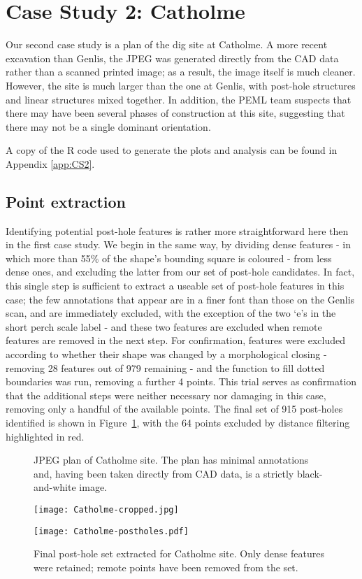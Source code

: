 \documentclass[../../ArchStats.tex]{subfiles}
\begin{document}
\section{Case Study 2: Catholme}
\label{sec:CS2}

Our second case study is a plan of the dig site at Catholme. A more recent excavation than Genlis, the JPEG was generated directly from the CAD data rather than a scanned printed image; as a result, the image itself is much cleaner. However, the site is much larger than the one at Genlis, with post-hole structures and linear structures mixed together. In addition, the PEML team suspects that there may have been several phases of construction at this site, suggesting that there may not be a single dominant orientation.

A copy of the R code used to generate the plots and analysis can be found in Appendix \ref{app:CS2}.

\subsection{Point extraction}
Identifying potential post-hole features is rather more straightforward here then in the first case study. We begin in the same way, by dividing dense features - in which more than 55\% of the shape's bounding square is coloured - from less dense ones, and excluding the latter from our set of post-hole candidates. In fact, this single step is sufficient to extract a useable set of post-hole features in this case; the few annotations that appear are in a finer font than those on the Genlis scan, and are immediately excluded, with the exception of the two `e's in the short perch scale label - and these two features are excluded when remote features are removed in the next step. For confirmation, features were excluded according to whether their shape was changed by a morphological closing - removing 28 features out of 979 remaining - and the function to fill dotted boundaries was run, removing a further 4 points. This trial serves as confirmation that the additional steps were neither necessary nor damaging in this case, removing only a handful of the available points. The final set of 915 post-holes identified is shown in Figure~\ref{fig:Catholme-f-ext-postholes}, with the 64 points excluded by distance filtering highlighted in red.


 \begin{figure}[h!]
 \begin{minipage}[t]{0.47\textwidth}
 \caption{JPEG plan of Catholme site. The plan has minimal annotations and, having been taken directly from CAD data, is a strictly black-and-white image.}
 \centering
 \texttt{[image: Catholme-cropped.jpg]}
 \end{minipage}
 \hfill
	\begin{minipage}[t]{0.47\textwidth}
	\caption{Final post-hole set extracted for Catholme site. Only dense features were retained; remote points have been removed from the set.}
	\label{fig:Catholme-f-ext-postholes}
	\centering
	\texttt{[image: Catholme-postholes.pdf]}
    \end{minipage}
 \end{figure}
\end{document}
